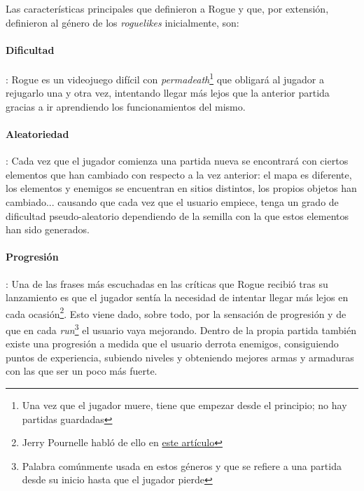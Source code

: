 Las características principales que definieron a Rogue y que, por extensión, definieron al género de los \textit{roguelikes} inicialmente, son:

\paragraph{Dificultad}: Rogue es un videojuego difícil con \textit{permadeath}\footnote{Una vez que el jugador muere, tiene que empezar desde el principio; no hay partidas guardadas} que obligará al jugador a rejugarlo una y otra vez, intentando llegar más lejos que la anterior partida gracias a ir aprendiendo los funcionamientos del mismo.

\paragraph{Aleatoriedad}: Cada vez que el jugador comienza una partida nueva se encontrará con ciertos elementos que han cambiado con respecto a la vez anterior: el mapa es diferente, los elementos y enemigos se encuentran en sitios distintos, los propios objetos han cambiado... causando que cada vez que el usuario empiece, tenga un grado de dificultad pseudo-aleatorio dependiendo de la semilla con la que estos elementos han sido generados.

\paragraph{Progresión}: Una de las frases más escuchadas en las críticas que Rogue recibió tras su lanzamiento es que el jugador sentía la necesidad de intentar llegar más lejos en cada ocasión\footnote{Jerry Pournelle habló de ello en \href{http://goo.gl/Iz2qg6}{este artículo}}. Esto viene dado, sobre todo, por la sensación de progresión y de que en cada \textit{run}\footnote{Palabra comúnmente usada en estos géneros y que se refiere a una partida desde su inicio hasta que el jugador pierde} el usuario vaya mejorando. Dentro de la propia partida también existe una progresión a medida que el usuario derrota enemigos, consiguiendo puntos de experiencia, subiendo niveles y obteniendo mejores armas y armaduras con las que ser un poco más fuerte.

